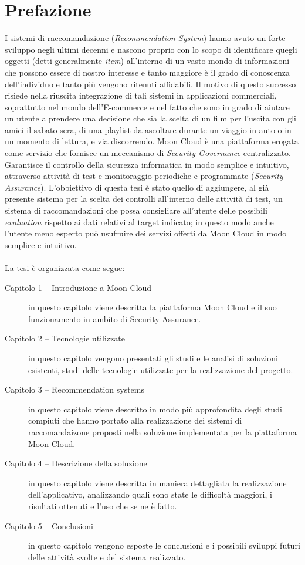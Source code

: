 \chapter{Prefazione}
I sistemi di raccomandazione (\textit{Recommendation System}) hanno avuto un forte sviluppo negli ultimi decenni e 
nascono proprio con lo scopo di identificare quegli oggetti (detti generalmente \textit{item}) all'interno di un vasto 
mondo di informazioni che possono essere di nostro interesse e tanto maggiore è il grado di conoscenza dell'individuo 
e tanto più vengono ritenuti affidabili.
\newline
Il motivo di questo successo risiede nella riuscita integrazione di tali sistemi in applicazioni commerciali, 
soprattutto nel mondo dell’E-commerce e nel fatto che sono in grado di aiutare un utente a prendere una decisione 
che sia la scelta di un film per l'uscita con gli amici il sabato sera, di una playlist da ascoltare durante 
un viaggio in auto o in un momento di lettura, e via discorrendo. 
\newline
Moon Cloud è una piattaforma erogata come servizio che fornisce un meccanismo di \textit{Security Governance} centralizzato. 
Garantisce il controllo della sicurezza informatica in modo semplice e intuitivo, attraverso attività di test e monitoraggio 
periodiche e programmate (\textit{Security Assurance}). L'obbiettivo di questa tesi è stato quello di aggiungere, al già 
presente sistema per la scelta dei controlli all'interno delle attività di test, un sistema di raccomandazioni che possa 
consigliare all'utente delle possibili \textit{evaluation} rispetto ai dati relativi al target indicato; in questo modo 
anche l'utente meno esperto può usufruire dei servizi offerti da Moon Cloud in modo semplice e intuitivo.  
\\
\\
La tesi è organizzata come segue:
\begin{description}
    \item[Capitolo 1 -- Introduzione a Moon Cloud] in questo capitolo viene descritta la piattaforma Moon Cloud e il suo funzionamento
    in ambito di Security Assurance. 
    \item[Capitolo 2 -- Tecnologie utilizzate] in questo capitolo vengono presentati gli studi e le analisi di soluzioni esistenti, 
    studi delle tecnologie utilizzate per la realizzazione del progetto.
    \item[Capitolo 3 -- Recommendation systems] in questo capitolo viene descritto in modo più approfondita degli studi compiuti che 
    hanno portato alla realizzazione dei sistemi di raccomandaizone proposti nella soluzione implementata per la piattaforma Moon Cloud. 
    \item[Capitolo 4 -- Descrizione della soluzione] in questo capitolo viene descritta in maniera dettagliata la realizzazione 
    dell'applicativo, analizzando quali sono state le difficoltà maggiori, i risultati ottenuti e l'uso che se ne è fatto. 
    \item[Capitolo 5 -- Conclusioni] in questo capitolo vengono esposte le conclusioni e i possibili sviluppi futuri delle attività
    svolte e del sistema realizzato.
\end{description}




